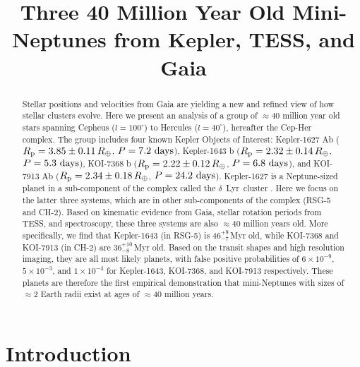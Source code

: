 \documentclass[12pt,twocolumn,linenumbers]{aastex63}
\begin{document}
\title{
  Three 40 Million Year Old Mini-Neptunes from Kepler, TESS, and Gaia
}



\begin{abstract}
  Stellar positions and velocities from Gaia are yielding a new and
  refined view of how stellar clusters evolve.
  Here we present an analysis of a group of $\approx$40 million
  year old stars spanning Cepheus ($l=100^\circ$) to Hercules
  ($l=40^\circ$), hereafter the Cep-Her complex.
  The group includes four known Kepler Objects of Interest:
  Kepler-1627 Ab ($R_{\rm p} = 3.85 \pm 0.11\,R_\oplus$, $P = 7.2\ {\rm days}$),
  Kepler-1643 b ($R_{\rm p} = 2.32 \pm 0.14\,R_\oplus$, $P = 5.3\ {\rm days}$),
  KOI-7368 b ($R_{\rm p} = 2.22 \pm 0.12\,R_\oplus$, $P = 6.8\ {\rm days}$), and
  KOI-7913 Ab ($R_{\rm p} = 2.34 \pm 0.18\,R_\oplus$, $P = 24.2\ {\rm days}$).
  Kepler-1627 is a Neptune-sized planet in a sub-component of the
  complex called the $\delta$\ Lyr\ cluster
  \citep{bouma_kep1627_2022}.
  Here we focus on the latter three systems, which are in other
  sub-components of the complex (RSG-5 and CH-2).
  Based on kinematic evidence from Gaia, stellar rotation periods from
  TESS, and spectroscopy, these three systems are also $\approx$40
  million years old.
  More specifically, we find that Kepler-1643 (in RSG-5) is
  $46^{+9}_{-7}$\,Myr old, while KOI-7368 and KOI-7913 (in CH-2) are
  $36^{+10}_{-8}$\,Myr old.
  Based on the transit shapes and high resolution imaging, they are
  all most likely planets, with false positive probabilities of
  $6\times10^{-9}$, $5\times10^{-3}$, and $1\times10^{-4}$ for
  Kepler-1643, KOI-7368, and KOI-7913 respectively.
  These planets are therefore the first empirical
  demonstration that mini-Neptunes with sizes of $\approx$2 Earth
  radii exist at ages of $\approx$40 million years.
\end{abstract}





\section{Introduction}
\end{document}
